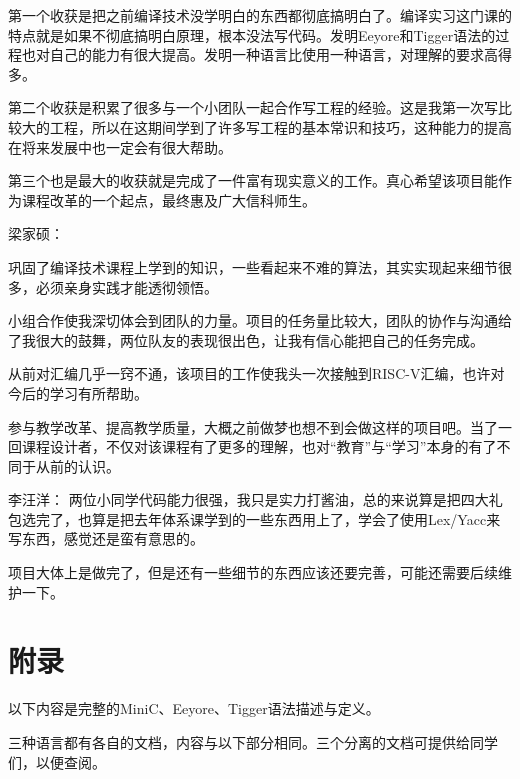 \documentclass[a4paper]{ctexart}
\begin{document}
第一个收获是把之前编译技术没学明白的东西都彻底搞明白了。编译实习这门课的特点就是如果不彻底搞明白原理，根本没法写代码。发明Eeyore和Tigger语法的过程也对自己的能力有很大提高。发明一种语言比使用一种语言，对理解的要求高得多。

第二个收获是积累了很多与一个小团队一起合作写工程的经验。这是我第一次写比较大的工程，所以在这期间学到了许多写工程的基本常识和技巧，这种能力的提高在将来发展中也一定会有很大帮助。

第三个也是最大的收获就是完成了一件富有现实意义的工作。真心希望该项目能作为课程改革的一个起点，最终惠及广大信科师生。

\bigskip
\noindent 梁家硕：

巩固了编译技术课程上学到的知识，一些看起来不难的算法，其实实现起来细节很多，必须亲身实践才能透彻领悟。

小组合作使我深切体会到团队的力量。项目的任务量比较大，团队的协作与沟通给了我很大的鼓舞，两位队友的表现很出色，让我有信心能把自己的任务完成。

从前对汇编几乎一窍不通，该项目的工作使我头一次接触到RISC-V汇编，也许对今后的学习有所帮助。

参与教学改革、提高教学质量，大概之前做梦也想不到会做这样的项目吧。当了一回课程设计者，不仅对该课程有了更多的理解，也对“教育”与“学习”本身的有了不同于从前的认识。

\bigskip
\noindent 李汪洋：
两位小同学代码能力很强，我只是实力打酱油，总的来说算是把四大礼包选完了，也算是把去年体系课学到的一些东西用上了，学会了使用Lex/Yacc来写东西，感觉还是蛮有意思的。

项目大体上是做完了，但是还有一些细节的东西应该还要完善，可能还需要后续维护一下。

\newpage
\section{附录}
以下内容是完整的MiniC、Eeyore、Tigger语法描述与定义。

三种语言都有各自的文档，内容与以下部分相同。三个分离的文档可提供给同学们，以便查阅。

\newpage

\newpage

\end{document}
